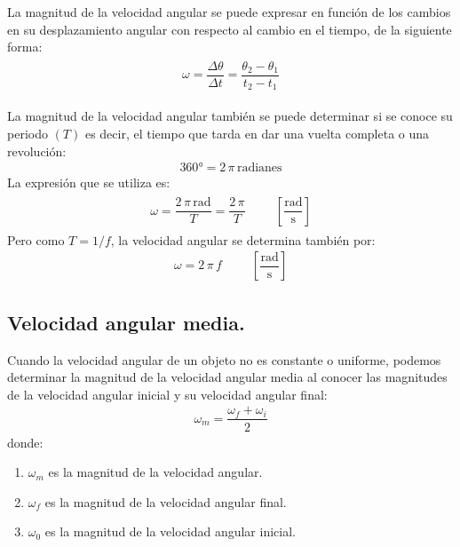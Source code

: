 \documentclass[12pt]{article}
\begin{document}
La magnitud de la velocidad angular se puede expresar en función de los cambios en su desplazamiento angular con respecto al cambio en el tiempo, de la siguiente forma:
\begin{eqnarray*}
\begin{aligned}
\omega = \dfrac{\Delta \theta}{\Delta t} =  \dfrac{\theta_{2} - \theta_{1}}{t_{2} - t_{1}}
\end{aligned}
\end{eqnarray*}

La magnitud de la velocidad angular también se puede determinar si se conoce su periodo $(T)$ es decir, el tiempo que tarda en dar una vuelta completa o una revolución:
\begin{align*}
\ang{360}  = 2 \, \pi \, \text{radianes}
\end{align*}
La expresión que se utiliza es:
\begin{eqnarray*}
\begin{aligned}
\omega = \dfrac{2 \, \pi \, \text{rad}}{T} =  \dfrac{2 \, \pi}{T} \hspace{1cm} \left[ \dfrac{\text{rad}}{\unit{\second}} \right]
\end{aligned}
\end{eqnarray*}
Pero como $T = 1 / f$, la velocidad angular se determina también por:
\begin{align*}
\omega = 2 \, \pi \, f \hspace{1cm} \left[ \dfrac{\text{rad}}{\unit{\second}} \right]
\end{align*}

\subsection{Velocidad angular media.}

Cuando la velocidad angular de un objeto no es constante o uniforme, podemos determinar la magnitud de la velocidad angular media al conocer las magnitudes de la velocidad angular inicial y su velocidad angular final:
\begin{align*}
\omega_{m} = \dfrac{\omega_{f} + \omega_{i}}{2}
\end{align*}
donde:
\begin{enumerate}[label=\roman*)]
\item $\omega_{m}$ es la magnitud de la velocidad angular.
\item $\omega_{f}$ es la magnitud de la velocidad angular final.
\item $\omega_{0}$ es la magnitud de la velocidad angular inicial.
\end{enumerate}
\end{document}
